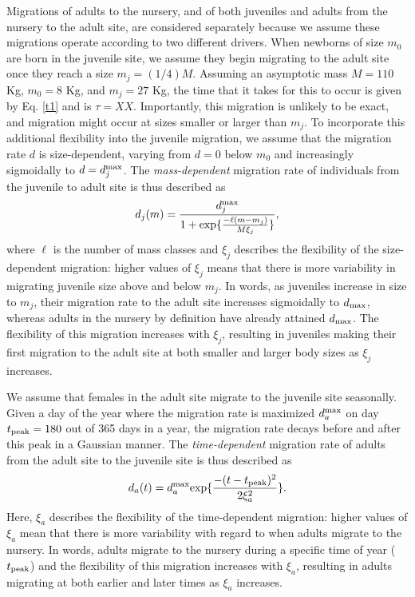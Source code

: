 \documentclass[]{rsos}%
\begin{document}
Migrations of adults to the nursery, and of both juveniles and adults from the nursery to the adult site, are considered separately because we assume these migrations operate according to two different drivers.
When newborns of size $m_0$ are born in the juvenile site, we assume they begin migrating to the adult site once they reach a size $m_j = (1/4)M$.
Assuming an asymptotic mass $M=110$ Kg, $m_0 = 8$ Kg, and $m_j = 27$ Kg, the time that it takes for this to occur is given by Eq. \ref{t1} and is $\tau = XX$.
Importantly, this migration is unlikely to be exact, and migration might occur at sizes smaller or larger than $m_j$.
To incorporate this additional flexibility into the juvenile migration, we assume that the migration rate $d$ is size-dependent, varying from $d=0$ below $m_0$ and increasingly sigmoidally to $d=d_j^{\rm max}$.
The \emph{mass-dependent} migration rate of individuals from the juvenile to adult site is thus described as
\begin{equation}
    d_j(m) = \frac{d_j^{\rm max}}{1 + {\rm exp}\{\frac{-\ell(m - m_j)}{M\xi_j}\}},
\end{equation}
where $\ell$ is the number of mass classes and $\xi_j$ describes the flexibility of the size-dependent migration: higher values of $\xi_j$ means that there is more variability in migrating juvenile size above and below $m_j$.
In words, as juveniles increase in size to $m_j$, their migration rate to the adult site increases sigmoidally to $d_{\rm max}$, whereas adults in the nursery by definition have already attained $d_{\rm max}$.
The flexibility of this migration increases with $\xi_j$, resulting in juveniles making their first migration to the adult site at both smaller and larger body sizes as $\xi_j$ increases.



We assume that females in the adult site migrate to the juvenile site seasonally.
Given a day of the year where the migration rate is maximized $d_a^{\rm max}$ on day $t_{\rm peak} = 180$ out of 365 days in a year, the migration rate decays before and after this peak in a Gaussian manner.
The \emph{time-dependent} migration rate of adults from the adult site to the juvenile site is thus described as
\begin{equation}
    d_a(t) = d_a^{\rm max}{\rm exp}\{\frac{-(t - t_{\rm peak})^2}{2\xi_a^2}\}.
\end{equation}
Here, $\xi_a$ describes the flexibility of the time-dependent migration: higher values of $\xi_a$ mean that there is more variability with regard to when adults migrate to the nursery. 
In words, adults migrate to the nursery during a specific time of year ($t_{\rm peak}$) and the flexibility of this migration increases with $\xi_a$, resulting in adults migrating at both earlier and later times as $\xi_a$ increases.
\end{document}
